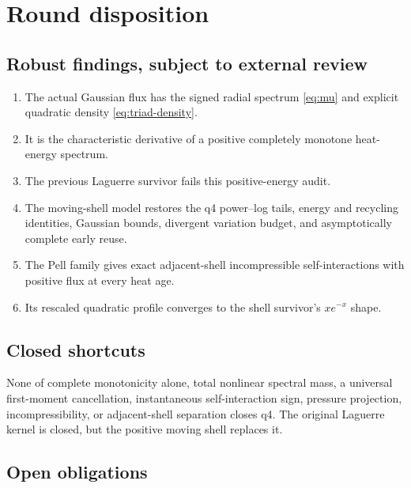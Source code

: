 \documentclass[11pt]{article}
\theoremstyle{remark}
\begin{document}
\section{Round disposition}

\subsection*{Robust findings, subject to external review}

\begin{enumerate}
 \item The actual Gaussian flux has the signed radial spectrum
 \eqref{eq:mu} and explicit quadratic density
 \eqref{eq:triad-density}.
 \item It is the characteristic derivative of a positive completely
 monotone heat-energy spectrum.
 \item The previous Laguerre survivor fails this positive-energy audit.
 \item The moving-shell model restores the q4 power--log tails, energy
 and recycling identities, Gaussian bounds, divergent variation budget,
 and asymptotically complete early reuse.
 \item The Pell family gives exact adjacent-shell incompressible
 self-interactions with positive flux at every heat age.
 \item Its rescaled quadratic profile converges to the shell survivor's
 \(xe^{-x}\) shape.
\end{enumerate}

\subsection*{Closed shortcuts}

None of complete monotonicity alone, total nonlinear spectral mass,
a universal first-moment cancellation, instantaneous self-interaction
sign, pressure projection, incompressibility, or adjacent-shell
separation closes q4.  The original Laguerre kernel is closed, but the
positive moving shell replaces it.

\subsection*{Open obligations}
\end{document}
